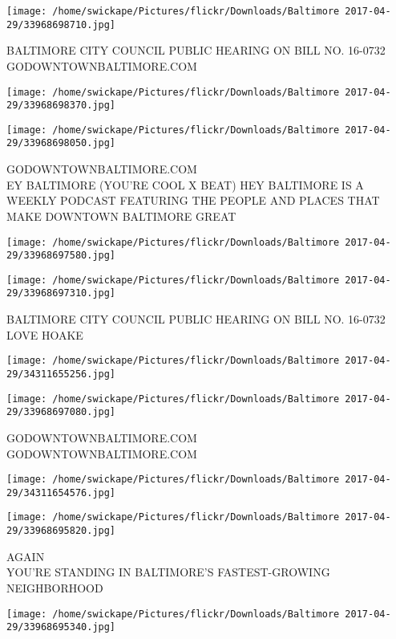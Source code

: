 \documentclass[10pt,letterpaper]{article}
\begin{document}
\vspace{0.25in}
\texttt{[image: /home/swickape/Pictures/flickr/Downloads/Baltimore 2017-04-29/33968698710.jpg]}

BALTIMORE CITY COUNCIL PUBLIC HEARING ON BILL NO. 16{-}0732\\
GODOWNTOWNBALTIMORE.COM
\pagebreak

\texttt{[image: /home/swickape/Pictures/flickr/Downloads/Baltimore 2017-04-29/33968698370.jpg]}

\vspace{0.25in}
\texttt{[image: /home/swickape/Pictures/flickr/Downloads/Baltimore 2017-04-29/33968698050.jpg]}

GODOWNTOWNBALTIMORE.COM\\
EY BALTIMORE (YOU'RE COOL X BEAT) HEY BALTIMORE IS A WEEKLY PODCAST FEATURING THE PEOPLE AND PLACES THAT MAKE DOWNTOWN BALTIMORE GREAT
\pagebreak

\texttt{[image: /home/swickape/Pictures/flickr/Downloads/Baltimore 2017-04-29/33968697580.jpg]}

\vspace{0.25in}
\texttt{[image: /home/swickape/Pictures/flickr/Downloads/Baltimore 2017-04-29/33968697310.jpg]}

BALTIMORE CITY COUNCIL PUBLIC HEARING ON BILL NO. 16{-}0732\\
LOVE HOAKE
\pagebreak

\texttt{[image: /home/swickape/Pictures/flickr/Downloads/Baltimore 2017-04-29/34311655256.jpg]}

\vspace{0.25in}
\texttt{[image: /home/swickape/Pictures/flickr/Downloads/Baltimore 2017-04-29/33968697080.jpg]}

GODOWNTOWNBALTIMORE.COM\\
GODOWNTOWNBALTIMORE.COM
\pagebreak

\texttt{[image: /home/swickape/Pictures/flickr/Downloads/Baltimore 2017-04-29/34311654576.jpg]}

\vspace{0.25in}
\texttt{[image: /home/swickape/Pictures/flickr/Downloads/Baltimore 2017-04-29/33968695820.jpg]}

AGAIN\\
YOU'RE STANDING IN BALTIMORE'S FASTEST{-}GROWING NEIGHBORHOOD
\pagebreak

\texttt{[image: /home/swickape/Pictures/flickr/Downloads/Baltimore 2017-04-29/33968695340.jpg]}
\end{document}
